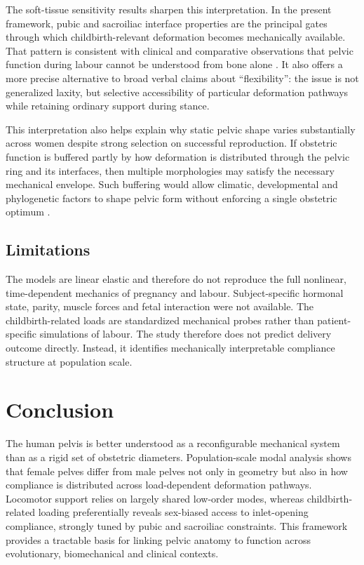 \documentclass[fleqn,usenatbib]{rsproca_new}
\begin{document}
The soft-tissue sensitivity results sharpen this interpretation. In the present framework, pubic and sacroiliac interface properties are the principal gates through which childbirth-relevant deformation becomes mechanically available. That pattern is consistent with clinical and comparative observations that pelvic function during labour cannot be understood from bone alone \citep{berghella2020,pink2024}. It also offers a more precise alternative to broad verbal claims about ``flexibility'': the issue is not generalized laxity, but selective accessibility of particular deformation pathways while retaining ordinary support during stance.

This interpretation also helps explain why static pelvic shape varies substantially across women despite strong selection on successful reproduction. If obstetric function is buffered partly by how deformation is distributed through the pelvic ring and its interfaces, then multiple morphologies may satisfy the necessary mechanical envelope. Such buffering would allow climatic, developmental and phylogenetic factors to shape pelvic form without enforcing a single obstetric optimum \citep{betti2017,weaver2009}.

\subsection{Limitations}
The models are linear elastic and therefore do not reproduce the full nonlinear, time-dependent mechanics of pregnancy and labour. Subject-specific hormonal state, parity, muscle forces and fetal interaction were not available. The childbirth-related loads are standardized mechanical probes rather than patient-specific simulations of labour. The study therefore does not predict delivery outcome directly. Instead, it identifies mechanically interpretable compliance structure at population scale.

\section{Conclusion}
The human pelvis is better understood as a reconfigurable mechanical system than as a rigid set of obstetric diameters. Population-scale modal analysis shows that female pelves differ from male pelves not only in geometry but also in how compliance is distributed across load-dependent deformation pathways. Locomotor support relies on largely shared low-order modes, whereas childbirth-related loading preferentially reveals sex-biased access to inlet-opening compliance, strongly tuned by pubic and sacroiliac constraints. This framework provides a tractable basis for linking pelvic anatomy to function across evolutionary, biomechanical and clinical contexts.
\end{document}
